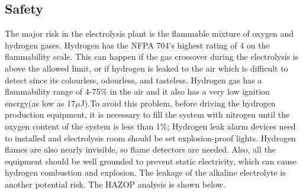 \documentclass[11pt, a4paper]{article}
\begin{document}
\subsection{Safety}
The major risk in the electrolysis plant is the flammable mixture of oxygen and hydrogen gases.
Hydrogen has the NFPA 704's highest rating of 4 on the flammability scale. \cite{safety} This can happen if the gas crossover during the electrolysis is above the allowed limit, or if hydrogen is leaked to the air which is difficult to detect since its colourless, odourless, and tasteless. Hydrogen gas has a flammability range of 4-75\% in the air and it also has a very low ignition energy(as low as 17$\mu$J).To avoid this problem, 
before driving the hydrogen production equipment, it is necessary to fill the system with nitrogen until the oxygen content of the system is less than 1\%; Hydrogen leak alarm devices need to installed and electrolysis room should be set explosion-proof lights. Hydrogen flames are also nearly invisible, so flame detectors are needed. Also, all the equipment should be well grounded to prevent static electricity, which can cause hydrogen combustion and explosion. The leakage of the alkaline electrolyte is another potential risk. The HAZOP analysis is shown below.
\end{document}
